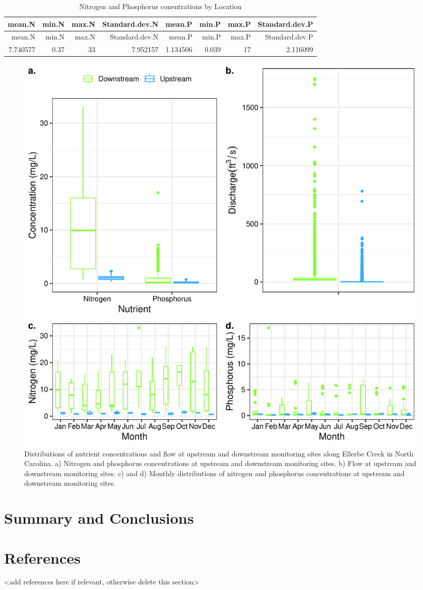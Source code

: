 \documentclass[12pt,]{article}
\begin{document}
\begin{longtable}[]{@{}rrrrrrrr@{}}
\caption{Nitrogen and Phosphorus conentrations by
Location}\tabularnewline
\toprule
mean.N & min.N & max.N & Standard.dev.N & mean.P & min.P & max.P &
Standard.dev.P\tabularnewline
\midrule
\endfirsthead
\toprule
mean.N & min.N & max.N & Standard.dev.N & mean.P & min.P & max.P &
Standard.dev.P\tabularnewline
\midrule
\endhead
7.740577 & 0.37 & 33 & 7.952157 & 1.134506 & 0.039 & 17 &
2.116099\tabularnewline
\bottomrule
\end{longtable}

\begin{figure}
\centering
\includegraphics{Landman_ENV872_Project_files/figure-latex/Data Analysis Figure 9-1.pdf}
\caption{Distributions of nutrient concentrations and flow at upstream
and downstream monitoring sites along Ellerbe Creek in North Carolina.
a) Nitrogen and phosphorus concentrations at upstream and downstream
monitoring sites. b) Flow at upstream and downstream monitoring sites.
c) and d) Monthly distributions of nitrogen and phosphorus
concentrations at upstream and downstream monitoring sites.}
\end{figure}

\newpage

\hypertarget{summary-and-conclusions}{%
\section{Summary and Conclusions}\label{summary-and-conclusions}}

\newpage

\hypertarget{references}{%
\section{References}\label{references}}

\textless{}add references here if relevant, otherwise delete this
section\textgreater{}
\end{document}
